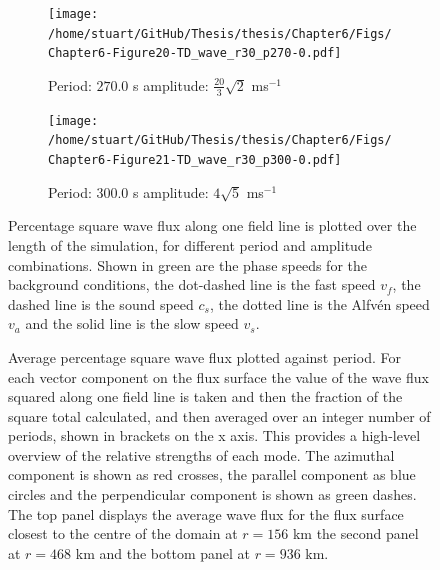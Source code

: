 \documentclass[a4paper,12pt,fourier,authoryear,custommargin]{Classes/PhDThesisPSnPDF}
\begin{document}
\begin{figure}
    \centering
\ContinuedFloat


    \begin{subfigure}[b]{0.79\columnwidth}
        \texttt{[image: /home/stuart/GitHub/Thesis/thesis/Chapter6/Figs/Chapter6-Figure20-TD\_wave\_r30\_p270-0.pdf]}
        \caption{Period: $270.0$ s amplitude: $\frac{20}{3}\sqrt{2}$ ms$^{{-1}}$}
        \label{fig:TD-wave-r30-p270-0}
    \end{subfigure}

    \begin{subfigure}[b]{0.79\columnwidth}
        \texttt{[image: /home/stuart/GitHub/Thesis/thesis/Chapter6/Figs/Chapter6-Figure21-TD\_wave\_r30\_p300-0.pdf]}
        \caption{Period: $300.0$ s amplitude: $4\sqrt{5}$ ms$^{{-1}}$}
        \label{fig:TD-wave-r30-p300-0}
    \end{subfigure}
    \caption{Percentage square wave flux along one field line is plotted over the length of the simulation, for different period and amplitude combinations. Shown in green are the phase speeds for the background conditions, the dot-dashed line is the fast speed $v_f$, the dashed line is the sound speed $c_s$, the dotted line is the Alfv\'en speed $v_a$ and the solid line is the slow speed $v_s$.}
    \label{fig:TD-fwave-r30-c}
\end{figure}




\begin{figure}[h]
    \centering
    \caption{Average percentage square wave flux plotted against period. For each vector component on the flux surface the value of the wave flux squared along one field line is taken and then the fraction of the square total calculated, and then averaged over an integer number of periods, shown in brackets on the x axis. This provides a high-level overview of the relative strengths of each mode. The azimuthal component is shown as red crosses, the parallel component as blue circles and the perpendicular component is shown as green dashes. The top panel displays the average wave flux for the flux surface closest to the centre of the domain at $r=156$ km the second panel at $r=468$ km and the bottom panel at $r=936$ km.}
    \label{fig:period-flux}
\end{figure}
\end{document}
